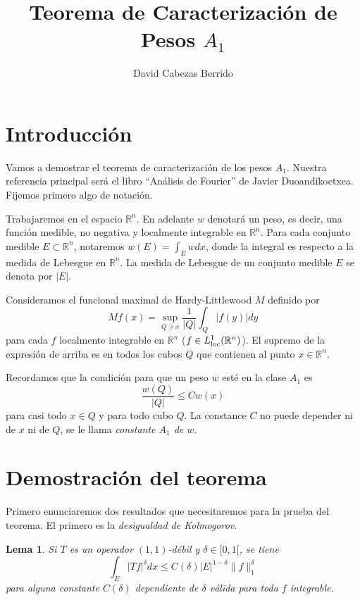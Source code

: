 \documentclass[12pt,english]{article}
\title{Teorema de Caracterización de Pesos $A_1$}
\author{David Cabezas Berrido}
\date{}
\newtheorem{lemma}[theorem]{Lema}
\theoremstyle{definition}
\theoremstyle{remark}
\begin{document}
\maketitle

\section*{Introducción}

Vamos a demostrar el teorema de caracterización de los pesos $A_1$. Nuestra referencia principal será el libro ``Análisis de Fourier'' de Javier Duoandikoetxea. Fijemos primero algo de notación.

Trabajaremos en el espacio $\mathbb{R}^n$. En adelante $w$ denotará un peso, es decir, una función medible, no negativa y localmente integrable en $\mathbb{R}^n$. Para cada conjunto medible $E\subset \mathbb{R}^n$, notaremos $w(E)=\int_E w dx$, donde la integral es respecto a la medida de Lebesgue en $\mathbb{R}^n$. La medida de Lebesgue de un conjunto medible $E$ se denota por $|E|$.

Consideramos el funcional maximal de Hardy-Littlewood $M$ definido por
\begin{equation}\label{eq: H-L}
Mf(x)=\sup_{Q\ni x}\frac{1}{|Q|}\int_Q|f(y)|dy
\end{equation}
para cada $f$ localmente integrable en $\mathbb{R}^n$ \big($f\in L^1_{\rm loc}(\mathbb{R}^n)$\big). El supremo de la expresión de arriba es en todos los cubos $Q$ que contienen al punto $x\in\mathbb{R}^n$.

Recordamos que la condición para que un peso $w$ esté en la clase $A_1$ es
\begin{equation}\label{eq: A1}
\frac{w(Q)}{|Q|}\leq C w(x) 
\end{equation}
para casi todo $x\in Q$ y para todo cubo $Q$. La constance $C$ no puede depender ni de $x$ ni de $Q$, se le llama \emph{constante $A_1$ de $w$}.

\section*{Demostración del teorema}

Primero enunciaremos dos resultados que necesitaremos para la prueba del teorema. El primero es la \emph{desigualdad de Kolmogorov}.

\begin{lemma} \label{lm: kolmogorov} Si $T$ es un operador $(1,1)$-débil y $\delta\in [0,1[$, se tiene
	\[\int_E |Tf|^\delta dx\leq C(\delta) |E|^{1-\delta}\|f\|_{1}^\delta\]
	para alguna constante $C(\delta)$ dependiente de $\delta$ válida para toda $f$ integrable.
\end{lemma}
\end{document}
